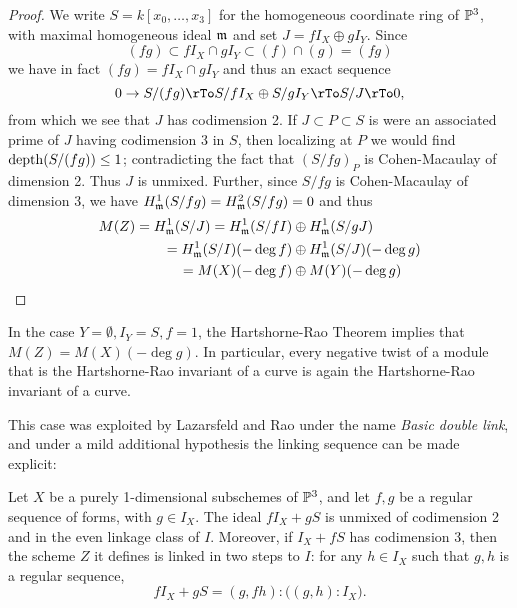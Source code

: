 \begin{proof}
We write $S = k[x_0,\dots,x_3]$ for the homogeneous coordinate ring of ${\mathbb P}^3$, with maximal homogeneous ideal $\mathfrak m$ and set $J = fI_X\oplus gI_Y$.
 Since 
 $$
 (fg) \subset fI_X\cap gI_Y \subset (f)\cap (g) = (fg)
 $$
 we have in fact $(fg) = fI_X\cap gI_Y $ and thus an exact sequence
 $$
 0\to S/(fg) \rTo S/fI_X\oplus S/gI_Y \rTo S/J \rTo 0,
 $$
 from which we see that $J$ has codimension 2. 
 If $J\subset P\subset S$ is were an associated prime of $J$ having codimension 3 in $S$, then localizing at $P$
 we would find $\operatorname{depth}(S/(fg))\leq 1$; contradicting the fact that $(S/fg)_P$ is Cohen-Macaulay of dimension 2.
 Thus $J$ is unmixed. Further, since $S/fg$ is Cohen-Macaulay of dimension 3,
 we have $H^1_\mathfrak m(S/fg) = H^2_\mathfrak m(S/fg) = 0$ and thus
\begin{align*}
  M(Z) = H^1_\mathfrak m(S/J)= H^1_\mathfrak m(S/fI)  &\oplus H^1_\mathfrak m(S/gJ)\\
  = H^1_\mathfrak m(S/I)(-\deg f) &\oplus H^1_\mathfrak m(S/J)(-\deg g)\\
  = M(X)(-\deg f) &\oplus M(Y)(-\deg g)
\end{align*}
\end{proof}

In the case $Y = \emptyset, I_Y = S, f = 1$, the Hartshorne-Rao Theorem implies that $M(Z) = M(X)(-\deg g)$.
In particular, every negative twist of a module that is the Hartshorne-Rao invariant of a curve is again the
Hartshorne-Rao invariant of a curve.

This case was exploited by
Lazarsfeld and Rao under the name \emph{Basic double link}, and under a mild additional hypothesis the linking sequence can be made explicit:

\begin{proposition}\label{basic link}
Let $X$ be a purely 1-dimensional subschemes of ${\mathbb P}^3$, and let $f,g$ be a regular sequence of forms, with $g \in I_X$. The ideal $fI_X+gS$ is unmixed of codimension 2 and in the even linkage class of $I$. Moreover, if $I_X+fS$ has codimension 3, then the scheme $Z$ it defines is linked in two steps to $I$: for any $h\in I_X$ such that $g,h$ is a regular sequence, 
$$
fI_X + gS = (g,fh):\bigl((g,h):I_X\bigr).
$$
\end{proposition}

